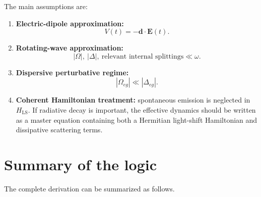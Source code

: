 \documentclass[11pt]{article}
\newcommand{\HLS}{H_{\mathrm{LS}}}
\begin{document}
The main assumptions are:
\begin{enumerate}[label=\textbf{A\arabic*.}]
\item \textbf{Electric-dipole approximation:}
\begin{equation}
V(t)=-\bm d\cdot\bm E(t).
\end{equation}
\item \textbf{Rotating-wave approximation:}
\begin{equation}
|\Omega|,\ |\Delta|,\ \text{relevant internal splittings}\ll \omega.
\end{equation}
\item \textbf{Dispersive perturbative regime:}
\begin{equation}
|\Omega_{eg}|\ll |\Delta_{eg}|.
\end{equation}
\item \textbf{Coherent Hamiltonian treatment:} spontaneous emission is neglected in $\HLS$. If radiative decay is important, the effective dynamics should be written as a master equation containing both a Hermitian light-shift Hamiltonian and dissipative scattering terms.
\end{enumerate}

\section{Summary of the logic}

The complete derivation can be summarized as follows.
\end{document}
